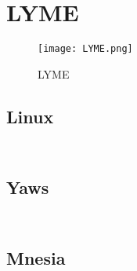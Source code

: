 \begin{lstlisting}[language=bash]

\end{lstlisting}


\chapter{LYME}


\begin{figure}[htbp]
\centering
\texttt{[image: LYME.png]}
\caption{LYME}
\end{figure}




\section{Linux}


\begin{lstlisting}[language=bash]

\end{lstlisting}




\begin{lstlisting}[language=bash]

\end{lstlisting}


\section{Yaws}


\begin{lstlisting}[language=bash]

\end{lstlisting}




\begin{lstlisting}[language=bash]

\end{lstlisting}


\section{Mnesia}



\begin{lstlisting}[language=bash]

\end{lstlisting}



\begin{lstlisting}[language=bash]

\end{lstlisting}



